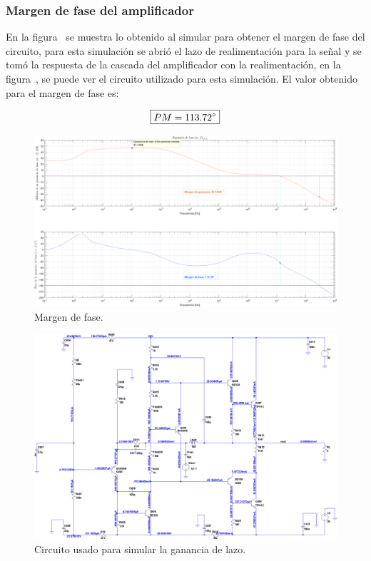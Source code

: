 \clearpage


\subsubsection{Margen de fase del amplificador}

En la figura~ se muestra lo obtenido al simular para obtener el margen de fase del circuito, para esta simulación se abrió el lazo de realimentación para la señal y se tomó la respuesta de la cascada del amplificador con la realimentación, en la figura~, se puede ver el circuito utilizado para esta simulación. El valor obtenido para el margen de fase es:

\begin{equation}
\boxed{PM = 113.72 \si[per-mode=symbol]{\degree}}
\end{equation}

\begin{figure}[H] %
\begin{center}
\includegraphics[width=0.9 \textwidth, angle=90]{./img/puntos/P11g_phase_margin.png}
\caption{\label{fig:fig_phase_margin}\footnotesize{Margen de fase.}}
\end{center}
\end{figure}

\begin{figure}[H] %
\begin{center}
\includegraphics[width=0.9 \textwidth, angle=90]{./img/circuitos_usados/P11g_phase_margin.png}
\caption{\label{fig:fig_loop_gain_circuit}\footnotesize{Circuito usado para simular la ganancia de lazo.}}
\end{center}
\end{figure}

